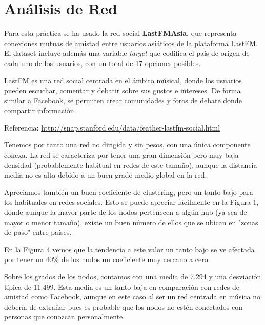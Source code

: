 \section{Análisis de Red}


Para esta práctica se ha usado la red social \textbf{LastFMAsia}, que representa conexiones mutuas de amistad entre usuarios asiáticos de la plataforma LastFM. El dataset incluye además una variable \textit{target} que codifica el país de origen de cada uno de los usuarios, con un total de 17 opciones posibles.

LastFM es una red social centrada en el ámbito músical, donde los usuarios pueden escuchar, comentar y debatir sobre sus gustos e intereses. De forma similar a Facebook, se permiten crear comunidades y foros de debate donde compartir información.

Referencia: \url{http://snap.stanford.edu/data/feather-lastfm-social.html}

\vspace{\baselineskip}

Tenemos por tanto una red no dirigida y sin pesos, con una única componente conexa. La red se caracteriza por tener una gran dimensión pero muy baja densidad (probablemente habitual en redes de este tamaño), aunque la distancia media no es alta debido a un buen grado medio global en la red.

Apreciamos también un buen coeficiente de clustering, pero un tanto bajo para los habituales en redes sociales. Esto se puede apreciar fácilmente en la Figura 1, donde aunque la mayor parte de los nodos pertenecen a algún hub (ya sea de mayor o menor tamaño), existe un buen número de ellos que se ubican en "zonas de paso" entre países.

En la Figura 4 vemos que la tendencia a este valor un tanto bajo se ve afectada por tener un 40\% de los nodos un coeficiente muy cercano a cero.

\vspace{\baselineskip}

Sobre los grados de los nodos, contamos con una media de 7.294 y una desviación típica de 11.499. Esta media es un tanto baja en comparación con redes de amistad como Facebook, aunque en este caso al ser un red centrada en música no debería de extrañar pues es probable que los nodos no estén conectados con personas que conozcan personalmente.


